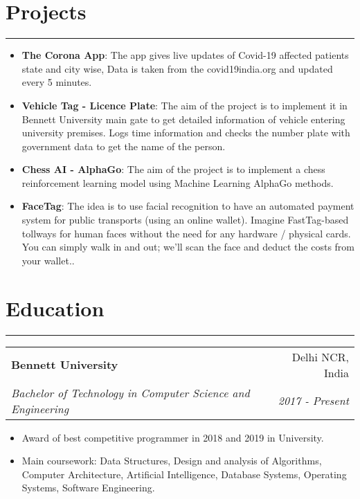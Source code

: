 \documentclass[a4paper,6pt]{article}
\begin{document}
\section*{Projects}
\vspace{-8px}
\hrule
\vspace{7px}
\hspace{5px}
\begin{itemize}
    \item \textbf{The Corona App}: \small The app gives live updates of Covid-19 affected patients state and city wise, Data is taken from the covid19india.org and updated every 5 minutes.
\normalsize
\vspace{2px}
	\item \textbf{Vehicle Tag - Licence Plate}: \small The aim of the project is to implement it in Bennett University main gate to get detailed information of vehicle entering university premises. Logs time information and checks the number plate with government data to get the name of the person.
\vspace{2px}
\normalsize
	\item \textbf{Chess AI - AlphaGo}: \small The aim of the project is to implement a chess reinforcement learning model using Machine Learning AlphaGo methods.
\vspace{2px}
\normalsize
	\item \textbf{FaceTag}: \small The idea is to use facial recognition to have an automated payment system for public transports (using an online wallet). Imagine FastTag-based tollways for human faces without the need for any hardware / physical cards. You can simply walk in and out; we'll scan the face and deduct the costs from your wallet.. 
\normalsize
\end{itemize}

\section*{Education}
\vspace{-8px}
\hrule
\vspace{4px}
\hspace{5px}
\begin{tabularx}{\textwidth}{X r}
	\textbf{Bennett University} & Delhi NCR, India \vspace{2px} \\
	\textit{\small Bachelor of Technology in Computer Science and Engineering } & \textit{2017 - Present} 
\end{tabularx}

\vspace{2px}

\begin{itemize}
    \item Award of best competitive programmer in 2018 and 2019 in University.
 \item Main coursework: Data Structures, Design and analysis of Algorithms, Computer Architecture, Artificial
Intelligence, Database Systems, Operating Systems, Software Engineering.
\end{itemize}
\end{document}
